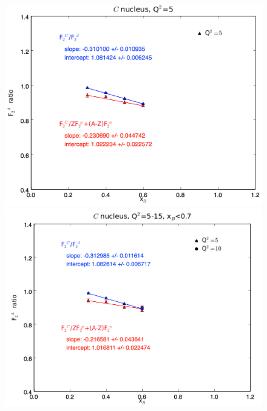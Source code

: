\documentclass[oneside]{article}
\begin{document}
 \begin{figure}
\begin{minipage}{0.5\textwidth}
 \includegraphics[width=\textwidth]{plots/q2_5/q2_5_C.png}
\end{minipage}\hfill\begin{minipage}{0.5\textwidth}
\includegraphics[width=\textwidth]{plots/q2_all_x_l7/q2_all_x_l7_C.png}
\end{minipage}\hfill\begin{minipage}{0.5\textwidth}

\end{minipage}
\end{figure}
\end{document}
